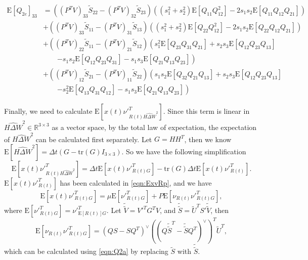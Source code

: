 \documentclass[10pt]{article}
\newcommand{\tr}[1]{\ensuremath{\mathrm{tr}\left( #1 \right)}}
\newcommand{\expect}[1]{\ensuremath{\mathrm{E}\left[ #1 \right]}}
\newcommand{\real}[1]{\ensuremath{\mathbb{R}^{ #1 }}}
\begin{document}
\begin{align}
	\expect{Q_{2e}}_{33} &= \left( (P^TV)_{33}\tilde{S}_{22} - (P^TV)_{32}\tilde{S}_{23} \right)\left( (s_1^2+s_2^2)\expect{Q_{11}Q_{12}^2} - 2s_1s_2\expect{Q_{11}Q_{12}Q_{21}} \right) \nonumber \\
	&+ \left( (P^TV)_{33}\tilde{S}_{11} - (P^TV)_{31}\tilde{S}_{13} \right)\left( (s_1^2+s_2^2)\expect{Q_{22}Q_{12}^2} - 2s_1s_2\expect{Q_{22}Q_{12}Q_{21}} \right) \nonumber \\
	&+ \left( (P^TV)_{22}\tilde{S}_{11} - (P^TV)_{21}\tilde{S}_{12} \right)\left( s_1^2\expect{Q_{23}Q_{31}Q_{21}} + s_2s_3\expect{Q_{12}Q_{23}Q_{13}} \right. \nonumber \\ &\qquad \left. - s_1s_2\expect{Q_{12}Q_{23}Q_{31}} - s_1s_3\expect{Q_{21}Q_{13}Q_{23}} \right) \nonumber \\
	&+ \left( (P^TV)_{12}\tilde{S}_{21} - (P^TV)_{11}\tilde{S}_{22} \right)\left( s_1s_2\expect{Q_{32}Q_{21}Q_{13}} + s_2s_3\expect{Q_{12}Q_{23}Q_{13}} \right. \nonumber \\ &\qquad \left. - s_2^2\expect{Q_{13}Q_{31}Q_{12}} - s_1s_3\expect{Q_{21}Q_{13}Q_{23}} \right)
\end{align}

Finally, we need to calculate $\expect{x(t)\nu'^T_{R(t)\widehat{H\Delta W}^2}}$.
Since this term is linear in $\widehat{H\Delta W}^2\in\real{3\times 3}$ as a vector space, by the total law of expectation, the expectation of $\widehat{H\Delta W}^2$ can be calculated first separately.
Let $G = HH^T$, then we know $\expect{\widehat{H\Delta W}^2} = \Delta t(G-\tr{G}I_{3\times 3})$.
So we have the following simplification
\begin{equation}
	\expect{x(t)\nu'^T_{R(t)\widehat{H\Delta W}^2}} = \Delta t\expect{x(t)\nu'^T_{R(t)G}} - \tr{G}\Delta t\expect{x(t)\nu'^T_{R(t)}}.
\end{equation}
$\expect{x(t)\nu'^T_{R(t)}}$ has been calculated in \eqref{eqn:ExvRp}, and we have
\begin{equation}
	\expect{x(t)\nu'^T_{R(t)G}} = \mu\expect{\nu'^T_{R(t)G}} + P\expect{\nu_{R(t)}\nu'^T_{R(t)G}},
\end{equation}
where $\expect{\nu'^T_{R(t)G}} = \nu'^T_{\expect{R(t)}G}$.
Let $\tilde{\tilde{V}} = V'^TG^TV$, and $\tilde{\tilde{S}} = \tilde{U}^TS'\tilde{\tilde{V}}$, then
\begin{equation}
	\expect{\nu_{R(t)}\nu'^T_{R(t)G}} = (QS-SQ^T)^\vee\left( \left( Q\tilde{\tilde{S}}^T-\tilde{\tilde{S}}Q^T \right)^\vee \right)^T\tilde{U}^T,
\end{equation}
which can be calculated using \eqref{eqn:Q2a} by replacing $\tilde{S}$ with $\tilde{\tilde{S}}$.
\end{document}
